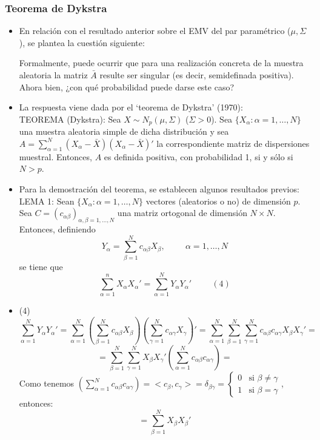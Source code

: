 \documentclass[11pt,a4paper]{article}
\begin{document}
\subsubsection{Teorema de Dykstra}
\begin{itemize}
\item En relación con el resultado anterior sobre el EMV del par paramétrico ($\mu, \Sigma$), se plantea la cuestión siguiente:

Formalmente, puede ocurrir que para una realización concreta de la muestra aleatoria la matriz $\bar{A}$ resulte ser singular (es decir, semidefinada positiva). Ahora bien, ¿con qué probabilidad puede darse este caso?

\item La respuesta viene dada por el `teorema de Dykstra' (1970): \\
TEOREMA (Dykstra): Sea $X \sim N_{p}(\mu, \Sigma)$ ($\Sigma > 0$). Sea $\{X_{\alpha}: \alpha=1,\dots,N\}$ una muestra aleatoria simple de dicha distribución y sea $A = \sum_{\alpha=1}^{N}(X_{\alpha} - \bar{X})(X_{\alpha}-\bar{X})'$ la correspondiente matriz de dispersiones muestral. Entonces, $A$ es definida positiva, con probabilidad 1, si y sólo si $N > p$.

\item Para la demostración del teorema, se establecen algunos resultados previos: \\
LEMA 1: Sean $\{X_{\alpha}: \alpha=1,\dots,N\}$ vectores (aleatorios o no) de dimensión $p$. Sea $C = (c_{\alpha\beta})_{\alpha,\beta=1,\dots,N}$ una matriz ortogonal de dimensión $N \times N$. Entonces, definiendo
$$Y_{\alpha} = \sum_{\beta=1}^{N} c_{\alpha\beta}X_{\beta}, \hspace{1cm} \alpha=1,\dots,N$$
se tiene que
$$\sum_{\alpha=1}^{n}X_{\alpha}X_{\alpha}' = \sum_{\alpha=1}^{N}Y_{\alpha}Y_{\alpha}' \hspace{1cm} (4)$$

\item (4) $$\sum_{\alpha=1}^{N} Y_{\alpha}Y_{\alpha}' = \sum_{\alpha=1}^{N} (\sum_{\beta=1}^{N} c_{\alpha\beta}X_{\beta})(\sum_{\gamma=1}^{N} c_{\alpha\gamma}X_{\gamma})' = \sum_{\alpha=1}^{N} \sum_{\beta=1}^{N} \sum_{\gamma=1}^{N} c_{\alpha\beta} c_{\alpha\gamma} X_{\beta}X_{\gamma}' =$$
$$= \sum_{\beta=1}^{N} \sum_{\gamma=1}^{N} X_{\beta} X_{\gamma}' (\sum_{\alpha=1}^{N} c_{\alpha\beta} c_{\alpha\gamma}) =$$
Como tenemos $(\sum_{\alpha=1}^{N} c_{\alpha\beta} c_{\alpha\gamma}) = <c_{\beta}, c_{\gamma}> = \delta_{\beta\gamma} = \begin{cases}
0 & \text{si } \beta \neq \gamma \\
1 & \text{si } \beta = \gamma
\end{cases}$, entonces:
$$= \sum_{\beta=1}^{N} X_{\beta}X_{\beta}'$$


\end{itemize}
\end{document}
